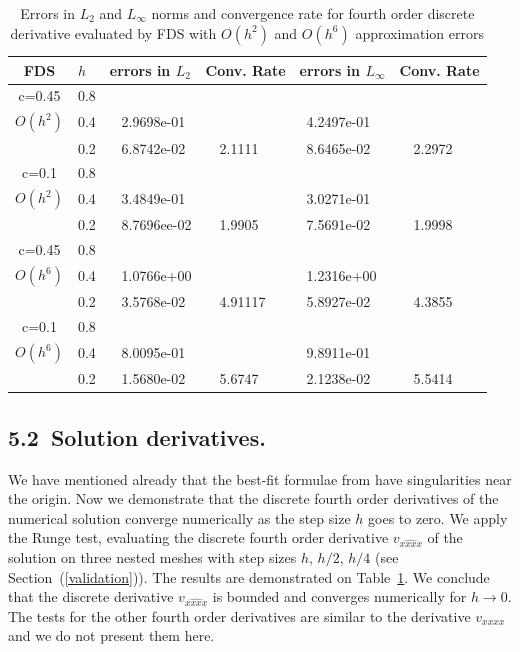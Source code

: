 \documentclass[leqno,11pt]{book}
\newcommand{\rf}[1]{(\ref{#1})}
\begin{document}
 \begin{center}
\begin{table}[ht]
\centering
		\begin{tabular}{||c|l|ll|ll||}
			\hline
			\hline
      FDS       & $h$ &errors in $L_2$&Conv. Rate& errors in $L_\infty$&Conv. Rate\\
   			\hline 
					\hline 
      c=0.45    &0.8    &             &            &           &   \\
   $O(h^2)$     &0.4    &~ 2.9698e-01  &            &~4.2497e-01 &   \\
                &0.2   &~ 6.8742e-02  &~~2.1111  &~8.6465e-02 &~~2.2972 \\
               	 \hline 
     c=0.1      &0.8   &             &           &                & \\
     $O(h^2)$   &0.4   &~ 3.4849e-01  &             &~3.0271e-01      &    \\
                &0.2  &~ 8.7696ee-02 &~~1.9905       &~7.5691e-02      &~~1.9998  \\
			\hline
			\hline 	
      c=0.45    &0.8   &            &            &             &    \\
       $O(h^6)$ &0.4   &~ 1.0766e+00   &           &~1.2316e+00  &   \\
                &0.2  &~ 3.5768e-02 &~~4.91117    &~5.8927e-02  &~~4.3855  \\
					  			\hline 	
     c=0.1      &0.8  &            &               &               &     \\
     $O(h^6)$  &0.4   &~ 8.0095e-01  &              &~9.8911e-01      &        \\
               &0.2  &~ 1.5680e-02&~~5.6747        &~2.1238e-02 &~~5.5414       \\
		   \hline
			\hline 
		\end{tabular}
		\caption{Errors  in $L_2$ and $L_\infty$ norms and  convergence  rate for  fourth order discrete derivative  evaluated by FDS with $O(h^2)$ and $O(h^6)$ approximation errors}
\label{tab:fourth-der}
\end{table}
\end{center}

\subsection{5.2~Solution derivatives.}

We have mentioned already that the best-fit formulae from \cite{Ch2011} have singularities near the origin. 
Now we demonstrate  that the discrete fourth order derivatives of the numerical solution converge numerically as the step size $h$ goes to zero.
We apply the Runge test, evaluating the discrete fourth order derivative $v_{\widehat{xxxx}}$ of the solution on three nested meshes with step sizes $h$, $h/2$, $h/4$ (see Section~\rf{validation}).  The results are demonstrated on Table~\ref{tab:fourth-der}.  
We conclude that the discrete  derivative $v_{\widehat{xxxx}}$ is bounded and converges numerically for $h\rightarrow 0$. The tests for the other fourth order derivatives are similar to the derivative $v_{xxxx}$ and we do not present them here.
\end{document}
